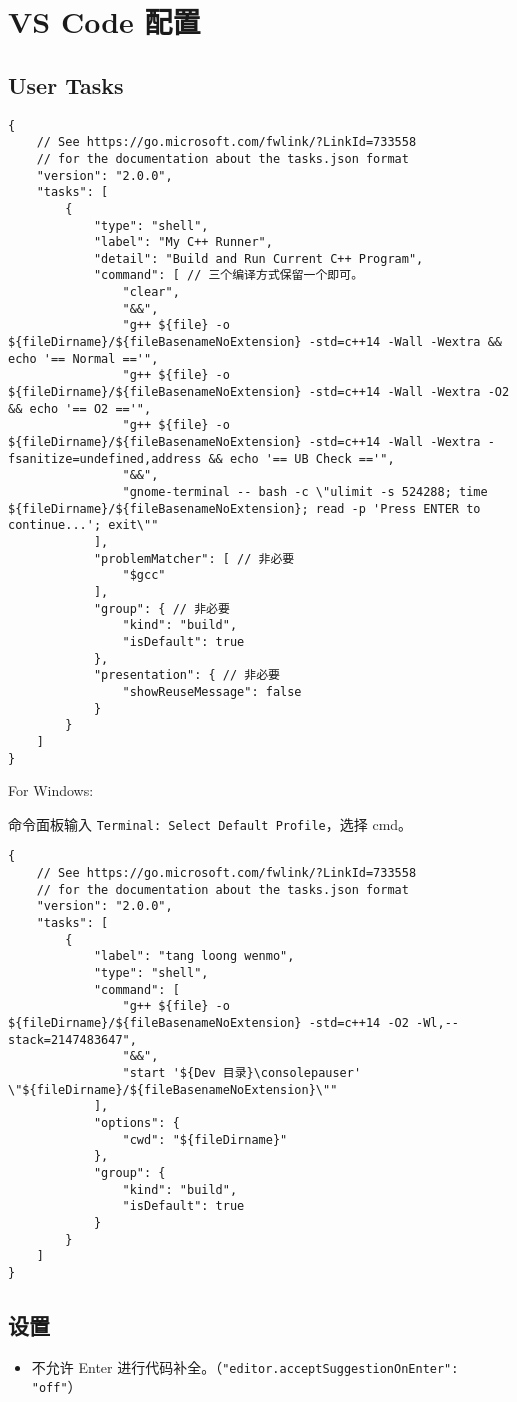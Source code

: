\section{VS Code 配置}

\subsection{User Tasks}

\begin{verbatim}
{
    // See https://go.microsoft.com/fwlink/?LinkId=733558
    // for the documentation about the tasks.json format
    "version": "2.0.0",
    "tasks": [
        {
            "type": "shell",
            "label": "My C++ Runner",
            "detail": "Build and Run Current C++ Program",
            "command": [ // 三个编译方式保留一个即可。
                "clear",
                "&&",
                "g++ ${file} -o ${fileDirname}/${fileBasenameNoExtension} -std=c++14 -Wall -Wextra && echo '== Normal =='",
                "g++ ${file} -o ${fileDirname}/${fileBasenameNoExtension} -std=c++14 -Wall -Wextra -O2 && echo '== O2 =='",
                "g++ ${file} -o ${fileDirname}/${fileBasenameNoExtension} -std=c++14 -Wall -Wextra -fsanitize=undefined,address && echo '== UB Check =='",
                "&&",
                "gnome-terminal -- bash -c \"ulimit -s 524288; time ${fileDirname}/${fileBasenameNoExtension}; read -p 'Press ENTER to continue...'; exit\""
            ],
            "problemMatcher": [ // 非必要
                "$gcc"
            ],
            "group": { // 非必要
                "kind": "build",
                "isDefault": true
            },
            "presentation": { // 非必要
                "showReuseMessage": false
            }
        }
    ]
}
\end{verbatim}

For Windows:

命令面板输入 \lstinline|Terminal: Select Default Profile|，选择 cmd。

\begin{verbatim}
{
    // See https://go.microsoft.com/fwlink/?LinkId=733558
    // for the documentation about the tasks.json format
    "version": "2.0.0",
    "tasks": [
        {
            "label": "tang loong wenmo",
            "type": "shell",
            "command": [
                "g++ ${file} -o ${fileDirname}/${fileBasenameNoExtension} -std=c++14 -O2 -Wl,--stack=2147483647",
                "&&",
                "start '${Dev 目录}\consolepauser' \"${fileDirname}/${fileBasenameNoExtension}\""
            ],
            "options": {
                "cwd": "${fileDirname}"
            },
            "group": {
                "kind": "build",
                "isDefault": true
            }
        }
    ]
}
\end{verbatim}

\subsection{设置}

\begin{itemize}
    \item 不允许 Enter 进行代码补全。（\lstinline|"editor.acceptSuggestionOnEnter": "off"|）
\end{itemize}